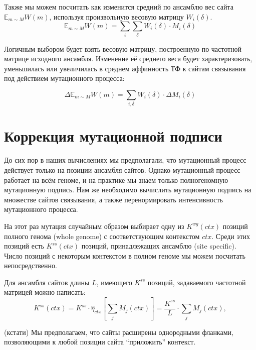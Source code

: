 \documentclass[a4paper]{article}
\begin{document}
Также мы можем посчитать как изменится средний по ансамблю вес сайта $\mathbb{E}_{m\sim M} W(m)$, используя произвольную весовую матрицу $W_i(\delta)$.
\begin{equation}
\mathbb{E}_{m\sim M} W(m) = \sum_i \sum_{\delta} W_i(\delta)\cdot M_i(\delta)
\end{equation}

Логичным выбором будет взять весовую матрицу, построенную по частотной матрице исходного ансамбля. Изменение её среднего веса будет характеризовать, уменьшилась или увеличилась в среднем аффинность ТФ к сайтам связывания под действием мутационного процесса:

\begin{equation}
\Delta\mathbb{E}_{m\sim M} W(m) = \sum_{i,\delta} W_i(\delta)\cdot\Delta{M}_i(\delta)
\end{equation}


\section{Коррекция мутационной подписи}

До сих пор в наших вычислениях мы предполагали, что мутационный процесс действует только на позиции ансамбля сайтов. Однако мутационный процесс работает на всём геноме, и на практике мы знаем только полногеномную мутационную подпись. Нам же необходимо вычислить мутационную подпись на множестве сайтов связывания, а также перенормировать интенсивность мутационного процесса.

На этот раз мутация случайным образом выбирает одну из $K^{wg}(ctx)$ позиций полного генома (whole genome) с соответствующим контекстом $ctx$. Среди этих позиций есть $K^{ss}(ctx)$ позиций, принадлежащих ансамблю (site specific). Число позиций с некоторым контекстом в полном геноме мы можем посчитать непосредственно.

Для ансамбля сайтов длины $L$, имеющего $K^{ss}$ позиций, задаваемого частотной матрицей можно написать:
\begin{equation}
K^{ss}(ctx) = K^{ss} \cdot \widehat{\eta}_{ctx}\left[ \sum_j M_j(ctx) \right] = \frac{K^{ss}}{L} \cdot \sum_j M_j(ctx),
\end{equation}

(кстати) Мы предполагаем, что сайты расширены однородными фланками, позволяющими к любой позиции сайта ``приложить'' контекст.

\end{document}
